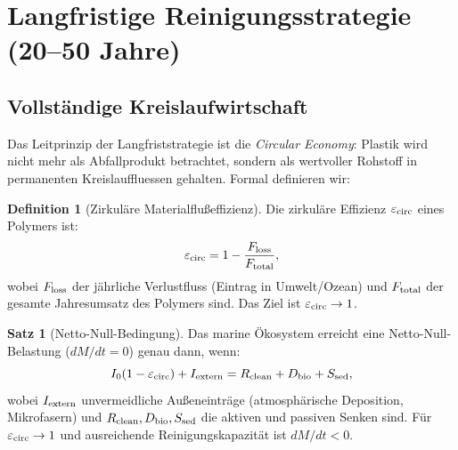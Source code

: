 ﻿\documentclass[12pt,a4paper]{article}
\theoremstyle{definition}
\newtheorem{definition}{Definition}[section]
\newtheorem{theorem}{Satz}[section]
\theoremstyle{remark}
\begin{document}
\section{Langfristige Reinigungsstrategie (20--50 Jahre)}
\label{sec:langfristig}

\subsection{Vollst\"andige Kreislaufwirtschaft}

Das Leitprinzip der Langfriststrategie ist die \textit{Circular Economy}:
Plastik wird nicht mehr als Abfallprodukt betrachtet, sondern als wertvoller
Rohstoff in permanenten Kreislauffluessen gehalten. Formal definieren wir:

\begin{definition}[Zirkuläre Materialflu\ss{}effizienz]
Die zirkul\"are Effizienz $\varepsilon_{\rm circ}$ eines Polymers ist:
\begin{equation}
  \varepsilon_{\rm circ} = 1 - \frac{F_{\rm loss}}{F_{\rm total}},
  \label{eq:circ_eff}
\end{equation}
wobei $F_{\rm loss}$ der j\"ahrliche Verlustfluss (Eintrag in Umwelt/Ozean)
und $F_{\rm total}$ der gesamte Jahresumsatz des Polymers sind. Das Ziel ist
$\varepsilon_{\rm circ} \to 1$.
\end{definition}

\begin{theorem}[Netto-Null-Bedingung]
Das marine Ökosystem erreicht eine Netto-Null-Belastung ($dM/dt = 0$)
genau dann, wenn:
\begin{equation}
  I_0 (1 - \varepsilon_{\rm circ}) + I_{\rm extern} = R_{\rm clean} + D_{\rm bio} + S_{\rm sed},
  \label{eq:netzero}
\end{equation}
wobei $I_{\rm extern}$ unvermeidliche Außeneintr\"age (atmosph\"arische
Deposition, Mikrofasern) und $R_{\rm clean}, D_{\rm bio}, S_{\rm sed}$
die aktiven und passiven Senken sind. F\"ur $\varepsilon_{\rm circ} \to 1$
und ausreichende Reinigungskapazit\"at ist $dM/dt < 0$.
\end{theorem}
\end{document}
